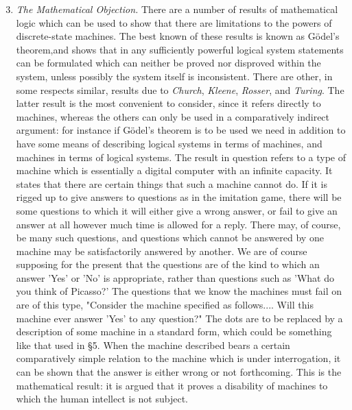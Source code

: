     \begin{enumerate}[label=(\arabic*)]
        \setcounter{enumi}{2}
        \item{\textit{The Mathematical Objection.} There are a number of results of mathematical logic which can be used to show that there are limitations to the powers of discrete-state machines. The best known of these results is known as Gödel's theorem,\footnotemark[1] and shows that in any sufficiently powerful logical system statements can be formulated which can neither be proved nor disproved within the system, unless possibly the system itself is inconsistent. There are other, in some respects similar, results due to \textit{Church}, \textit{Kleene}, \textit{Rosser}, and \textit{Turing}. The latter result is the most convenient to consider, since it refers directly to machines, whereas the others can only be used in a comparatively indirect argument: for instance if Gödel's theorem is to be used we need in addition to have some means of describing logical systems in terms of machines, and machines in terms of logical systems. The result in question refers to a type of machine which is essentially a digital computer with an infinite capacity. It states that there are certain things that such a machine cannot do. If it is rigged up to give answers to questions as in the imitation game, there will be some questions to which it will either give a wrong answer, or fail to give an answer at all however much time is allowed for a reply. There may, of course, be many such questions, and questions which cannot be answered by one machine may be satisfactorily answered by another. We are of course supposing for the present that the questions are of the kind to which an answer 'Yes' or 'No' is appropriate, rather than questions such as 'What do you think of Picasso?' The questions that we know the machines must fail on are of this type, "Consider the machine specified as follows.... Will this machine ever answer 'Yes' to any question?" The dots are to be replaced by a description of some machine in a standard form, which could be something like that used in \S 5. When the machine described bears a certain comparatively simple relation to the machine which is under interrogation, it can be shown that the answer is either wrong or not forthcoming. This is the mathematical result: it is argued that it proves a disability of machines to which the human intellect is not subject.}
    \end{enumerate}

